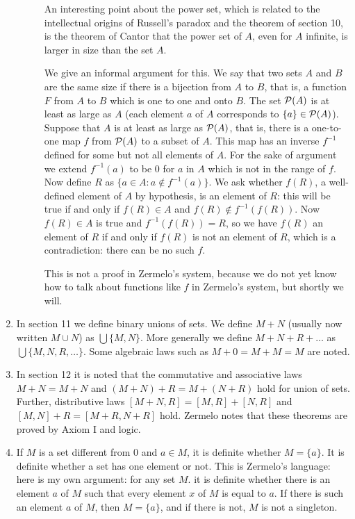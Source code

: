 \documentclass[12pt]{article}
\begin{document}
\begin{enumerate}
\begin{description}
An interesting point about the power set, which is related to the intellectual origins of Russell's paradox and the theorem of section 10, is the theorem of Cantor that the
power set of $A$, even for $A$ infinite, is larger in size than the set $A$.

We give an informal argument for this.  We say that two sets $A$ and $B$ are the same size if there is a bijection from $A$ to $B$, that is, a function $F$ from $A$ to $B$ which is one to one and onto $B$.  The set ${\cal P}(A)$ is at least as large as $A$ (each element $a$ of $A$ corresponds to $\{a\} \in {\cal P}(A)$).  Suppose that $A$ is at least as large as ${\cal P}(A)$, that is, there is a one-to-one map $f$ from ${\cal P}(A)$ to a subset of $A$.  This map has an inverse $f^{-1}$ defined for some but not all elements of $A$.  For the sake of argument we extend $f^{-1}(a)$ to be 0 for $a$ in $A$ which is not in the range of $f$.  Now define $R$ as $\{a \in A:a \not\in f^{-1}(a)\}$.  We ask whether $f(R)$, a well-defined element of $A$ by hypothesis, is an element of $R$:  this will be true if and only if $f(R) \in A$ and $f(R) \not\in f^{-1}(f(R))$.  Now $f(R) \in A$ is true and $f^{-1}(f(R))= R$, so we have
$f(R)$ an element of $R$ if and only if $f(R)$ is not an element of $R$, which is a contradiction:  there can be no such $f$.

This is not a proof in Zermelo's system, because we do not yet know how to talk about functions like $f$ in Zermelo's system, but shortly we will.

\end{description}

\item In section 11 we define binary unions of sets.  We define $M+N$ (usually now written $M \cup N$) as $\bigcup \{M,N\}$.  More generally we define $M+N+R +\ldots$
as $\bigcup \{M,N,R,\ldots\}$.  Some algebraic laws such as $M+0=M+M=M$ are noted.

\item In section 12 it is noted that the commutative and associative laws $M+N=M+N$ and $(M+N)+R = M+(N+R)$ hold for union of sets.  Further, distributive laws
$[M+N,R] = [M,R]+[N,R]$ and $[M,N] + R = [M+R,N+R]$ hold.  Zermelo notes that these theorems are proved by Axiom I and logic.

\item If $M$ is a set different from 0 and $a \in M$, it is definite whether $M=\{a\}$.  It is definite whether a set has one element or not.  This is Zermelo's language:  here is my own argument:  for any set $M$. it is definite whether there is an element $a$ of $M$ such that every element $x$ of $M$ is equal to $a$.  If there is such an element $a$ of $M$, then $M=\{a\}$, and if there is not, $M$ is not a singleton.


\end{enumerate}
\end{document}
